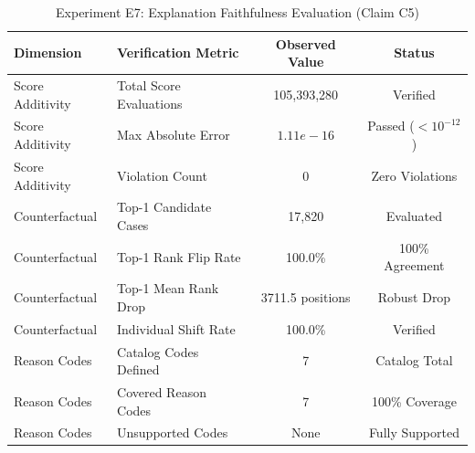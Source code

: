 \begin{table}[t]
\centering
\small
\caption{Experiment E7: Explanation Faithfulness Evaluation (Claim C5)}
\label{tab:e7_faithfulness}
\begin{tabular}{llcc}
\toprule
Dimension & Verification Metric & Observed Value & Status \\
\midrule
Score Additivity & Total Score Evaluations & 105,393,280 & Verified \\
Score Additivity & Max Absolute Error & $1.11e-16$ & Passed ($< 10^{-12}$) \\
Score Additivity & Violation Count & 0 & Zero Violations \\
\midrule
Counterfactual & Top-1 Candidate Cases & 17,820 & Evaluated \\
Counterfactual & Top-1 Rank Flip Rate & 100.0\% & 100\% Agreement \\
Counterfactual & Top-1 Mean Rank Drop & 3711.5 positions & Robust Drop \\
Counterfactual & Individual Shift Rate & 100.0\% & Verified \\
\midrule
Reason Codes & Catalog Codes Defined & 7 & Catalog Total \\
Reason Codes & Covered Reason Codes & 7 & 100\% Coverage \\
Reason Codes & Unsupported Codes & None & Fully Supported \\
\bottomrule
\end{tabular}
\end{table}

